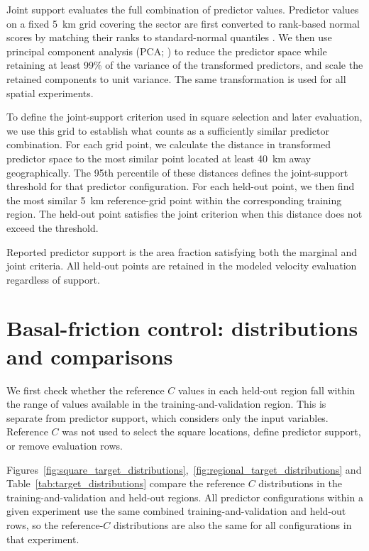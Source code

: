 \documentclass[review,jog]{igs}
\begin{document}
Joint support evaluates the full combination of predictor values. Predictor values on a fixed 5~km grid covering the sector are first converted to rank-based normal scores by matching their ranks to standard-normal quantiles \citep{beasley2009rank}. We then use principal component analysis (PCA; \citealp{jolliffe2016principal}) to reduce the predictor space while retaining at least 99\% of the variance of the transformed predictors, and scale the retained components to unit variance. The same transformation is used for all spatial experiments.

To define the joint-support criterion used in square selection and later
evaluation, we use this grid to establish what counts as a sufficiently similar
predictor combination. For each grid point, we calculate the distance in
transformed predictor space to the most similar point located at least 40~km
away geographically. The 95th percentile of these distances defines the
joint-support threshold for that predictor configuration. For each held-out
point, we then find the most similar 5~km reference-grid point within the corresponding training region. The held-out point satisfies the joint criterion when this distance does not exceed the threshold.

Reported predictor support is the area fraction satisfying both the marginal and joint criteria. All held-out points are retained in the modeled velocity evaluation regardless of support.

\section{Basal-friction control: distributions and comparisons}
\label{app:target_distributions}

We first check whether the reference $C$ values in each held-out region fall within the range of values available in the training-and-validation region. This is separate from predictor support, which considers only the input variables. Reference $C$ was not used to select the square locations, define predictor support, or remove evaluation rows.

Figures~\ref{fig:square_target_distributions},~\ref{fig:regional_target_distributions} and Table~\ref{tab:target_distributions} compare the reference $C$ distributions in the training-and-validation and held-out regions. All predictor configurations within a given experiment use the same combined training-and-validation and held-out rows, so the reference-$C$ distributions are also the same for all configurations in that experiment.
\end{document}
